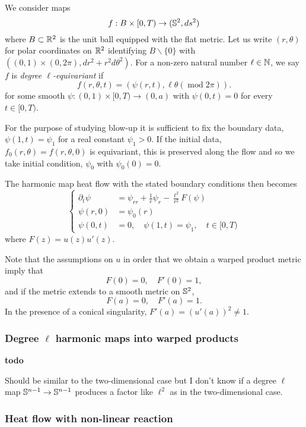 \documentclass{amsart}
\begin{document}
We consider maps
\[
f : B \times [0, T) \to (\S^2, ds^2)
\]
where $B \subset \R^2$ is the unit ball equipped with the flat metric. Let us write $(r, \theta)$ for polar coordinates on $\R^2$ identifying $B \backslash \{0\}$ with $((0, 1) \times (0, 2\pi), dr^2 + r^2 d\theta^2)$. For a non-zero natural number \(\ell \in \N\), we say $f$ is \emph{degree $\ell$-equivariant} if
\[
f (r, \theta, t) = (\psi(r, t), \ell\theta (\operatorname{mod} 2\pi)).
\]
for some smooth $\psi : (0, 1) \times [0, T) \to (0, a)$ with \(\psi(0, t) = 0\) for every \(t \in [0, T)\).

For the purpose of studying blow-up it is sufficient to fix the boundary data, \(\psi(1, t) = \psi_1\) for a real constant \(\psi_1 > 0\). If the initial data, \(f_0(r, \theta) = f(r, \theta, 0)\) is equivariant, this is preserved along the flow and so we take initial condition, \(\psi_0\) with \(\psi_0(0) = 0\).

The harmonic map heat flow with the stated boundary conditions then becomes
\begin{equation}
\label{eq:harmonic_map_heat_flow}
\begin{cases}
\partial_t \psi &= \psi_{rr} + \frac{1}{r} \psi_r - \frac{\ell^2}{r^2} F(\psi) \\
\psi(r, 0) &= \psi_0(r) \\
\psi(0, t) &= 0, \quad \psi(1, t) = \psi_1, \quad t \in [0, T)
\end{cases}
\end{equation}
where \(F(z) = u(z)u'(z)\).

Note that the assumptions on \(u\) in order that we obtain a warped product metric imply that
\[
F(0) = 0, \quad F'(0) = 1,
\]
and if the metric extends to a smooth metric on \(\S^2\),
\[
F(a) = 0, \quad F'(a) = 1.
\]
In the presence of a conical singularity, \(F'(a) = (u'(a))^2 \ne 1\).

\subsubsection*{Degree \(\ell\) harmonic maps into warped products}

\textbf{todo}

Should be similar to the two-dimensional case but I don't know if a degree \(\ell\) map \(\S^{n-1} \to \S^{n-1}\) produces a factor like \(\ell^2\) as in the two-dimensional case.

\subsubsection*{Heat flow with non-linear reaction}
\end{document}
